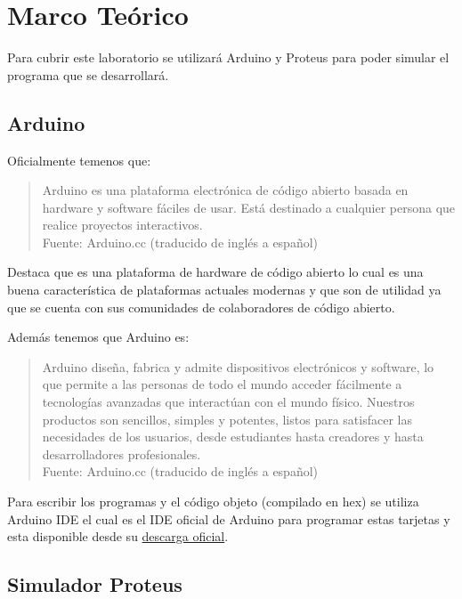 \documentclass{article}
\begin{document}
\section{Marco Teórico}

Para cubrir este laboratorio se utilizará Arduino y Proteus para poder simular el programa que se desarrollará.

\subsection{Arduino}

Oficialmente temenos que:

\begin{quote}
    Arduino es una plataforma electrónica de código abierto basada en hardware y software fáciles de usar. Está destinado a cualquier persona que realice proyectos interactivos.\\ \footnotesize
    Fuente: Arduino.cc (traducido de inglés a español) \cite{arduino-2022}
\end{quote}

Destaca que es una plataforma de hardware de código abierto lo cual es una buena característica de plataformas actuales modernas y que son de utilidad ya que se cuenta con sus comunidades de colaboradores de código abierto.

Además tenemos que Arduino es:

\begin{quote}
    Arduino diseña, fabrica y admite dispositivos electrónicos y software, lo que permite a las personas de todo el mundo acceder fácilmente a tecnologías avanzadas que interactúan con el mundo físico. Nuestros productos son sencillos, simples y potentes, listos para satisfacer las necesidades de los usuarios, desde estudiantes hasta creadores y hasta desarrolladores profesionales. \\ \footnotesize
    Fuente: Arduino.cc (traducido de inglés a español) \cite{arduino-2022}
\end{quote}

Para escribir los programas y el código objeto (compilado en hex) se utiliza Arduino IDE el cual es el IDE oficial de Arduino para programar estas tarjetas y esta disponible desde su \href{https://docs.arduino.cc/software/ide-v2/tutorials/getting-started/ide-v2-downloading-and-installing}{descarga oficial}.

\subsection{Simulador Proteus}
\end{document}
